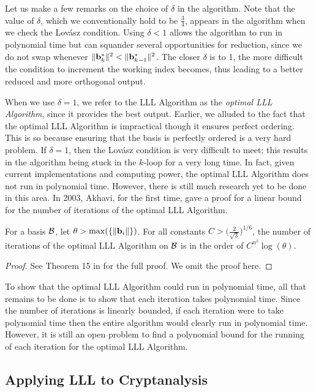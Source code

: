 \documentclass[a4paper,12pt]{article}
\begin{document}
Let us make a few remarks on the choice of $\delta$ in the algorithm. Note that the value of $\delta$, which we conventionally hold to be $\frac{3}{4}$, appears in the algorithm when we check the Lov\'asz condition. Using $\delta<1$ allows the algorithm to run in polynomial time but can squander several opportunities for reduction, since we do not swap whenever $\|\mathbf{b}_k^*\|^2 < \|\mathbf{b}_{k-1}^*\|^2$. The closer $\delta$ is to 1, the more difficult the condition to increment the working index becomes, thus leading to a better reduced and more orthogonal output. 

When we use $\delta = 1$, we refer to the LLL Algorithm as the \textit{optimal LLL Algorithm}, since it provides the best output. Earlier, we alluded to the fact that the optimal LLL Algorithm is impractical though it ensures perfect ordering. This is so because ensuring that the basis is perfectly ordered is a very hard problem. If $\delta = 1$, then the Lov\'asz condition is very difficult to meet; this results in the algorithm being stuck in the $k$-loop for a very long time. In fact, given current implementations and computing power, the optimal LLL Algorithm does not run in polynomial time. However, there is still much research yet to be done in this area. In 2003, Akhavi, for the first time, gave a  proof for a linear bound for the number of iterations of the optimal LLL Algorithm. 

\begin{thm}
For a basis $\mathcal{B}$, let $\theta > \max(\lbrace\|\mathbf{b}_i\|\rbrace)$. For all constants $C > \big(\frac{2}{\sqrt{3}}\big)^{1/6}$, the number of iterations of the optimal LLL Algorithm on $\mathcal{B}$ is in the order of $C^{n^3}\log(\theta)$.
\end{thm}

\begin{proof}
See Theorem 15 in \cite{Akhavi} for the full proof. We omit the proof here. 
\end{proof}

To show that the optimal LLL Algorithm could run in polynomial time, all that remains to be done is to show that each iteration takes polynomial time. Since the number of iterations is linearly bounded, if each iteration were to take polynomial time then the entire algorithm would clearly run in polynomial time. However, it is still an open problem to find a polynomial bound for the running of each iteration for the optimal LLL Algorithm.

\subsection{Applying LLL to Cryptanalysis}
\end{document}
